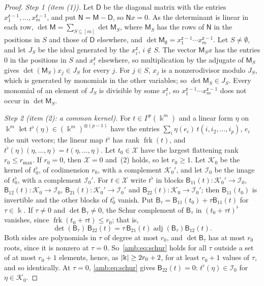 \begin{proof}
\emph{Step 1 (item (1)).} Let $\mathsf D$ be the diagonal matrix with the entries $x_1^{\mathsf z-1},\dots,x_m^{\mathsf z-1}$, and put
$\mathsf N=\mathsf M-\mathsf D$, so $\mathsf Nx=0$. As the determinant is linear in each row,
$\det\mathsf M=\sum_{S\subseteq[m]}\det\mathsf M_S$, where $\mathsf M_S$ has the rows of $\mathsf N$ in the positions in
$S$ and those of $\mathsf D$ elsewhere, and $\det\mathsf M_\emptyset=x_1^{\mathsf z-1}\cdots x_m^{\mathsf z-1}$. Let $S\ne\emptyset$, and
let $J_S$ be the ideal generated by the $x_i^{\mathsf z}$, $i\notin S$. The vector $\mathsf M_Sx$ has the entries $0$ in the
positions in $S$ and $x_i^{\mathsf z}$ elsewhere, so multiplication by the adjugate of $\mathsf M_S$ gives
$\det(\mathsf M_S)x_j\in J_S$ for every $j$. For $j\in S$, $x_j$ is a nonzerodivisor modulo $J_S$, which is generated
by monomials in the other variables; so $\det\mathsf M_S\in J_S$. Every monomial of an element of $J_S$ is divisible by
some $x_i^{\mathsf z}$, so $x_1^{\mathsf z-1}\cdots x_m^{\mathsf z-1}$ does not occur in $\det\mathsf M_S$.

\emph{Step 2 (item (2): a common kernel).} For $t\in\Gamma^p(\Bbbk^m)$ and a linear form $\eta$ on $\Bbbk^m$ let
$t^\flat(\eta)\in(\Bbbk^m)^{\otimes(p-1)}$ have the entries $\sum_i\eta(e_i)\,t(i,i_2,\dots,i_p)$, $e_i$ the unit
vectors; the linear map $t^\flat$ has rank $\operatorname{frk}(t)$, and $t^\flat(\eta)(\eta,\dots,\eta)=t(\eta,\dots,\eta)$.
Let $t_0\in\mathcal X$ have the largest flattening rank $r_0\le r_{\max}$. If $r_0=0$, then $\mathcal X=0$ and~(2) holds, so
let $r_0\ge1$. Let $\mathcal K_0$ be the kernel of $t_0^\flat$, of
codimension $r_0$, with a complement $\mathcal K_0'$, and let $\mathcal I_0$ be the image of $t_0^\flat$, with a complement
$\mathcal I_0'$. For $t\in\mathcal X$ write $t^\flat$ in blocks $\mathsf B_{11}(t)\colon\mathcal K_0'\to\mathcal I_0$,
$\mathsf B_{12}(t)\colon\mathcal K_0\to\mathcal I_0$, $\mathsf B_{21}(t)\colon\mathcal K_0'\to\mathcal I_0'$ and
$\mathsf B_{22}(t)\colon\mathcal K_0\to\mathcal I_0'$; then $\mathsf B_{11}(t_0)$ is invertible and the other blocks of
$t_0^\flat$ vanish. Put $\mathsf B_\tau=\mathsf B_{11}(t_0)+\tau\mathsf B_{11}(t)$ for $\tau\in\Bbbk$. If $\tau\ne0$ and
$\det\mathsf B_\tau\ne0$, the Schur complement of $\mathsf B_\tau$ in $(t_0+\tau t)^\flat$ vanishes, since
$\operatorname{frk}(t_0+\tau t)\le r_0$; that is,
\begin{equation}\label{amb:eq:schur}
 \det(\mathsf B_\tau)\,\mathsf B_{22}(t)=\tau\,\mathsf B_{21}(t)\operatorname{adj}(\mathsf B_\tau)\mathsf B_{12}(t).
\end{equation}
Both sides are polynomials in $\tau$ of degree at most $r_0$, and $\det\mathsf B_\tau$ has at most $r_0$ roots, since it is
nonzero at $\tau=0$. So~\eqref{amb:eq:schur} holds for all $\tau$ outside a set of at most $r_0+1$ elements, hence, as
$\lvert \Bbbk\rvert\ge2r_0+2$, for at least $r_0+1$ values of $\tau$, and so identically. At $\tau=0$, \eqref{amb:eq:schur} gives
$\mathsf B_{22}(t)=0$: $t^\flat(\eta)\in\mathcal I_0$ for $\eta\in\mathcal K_0$.


\end{proof}
